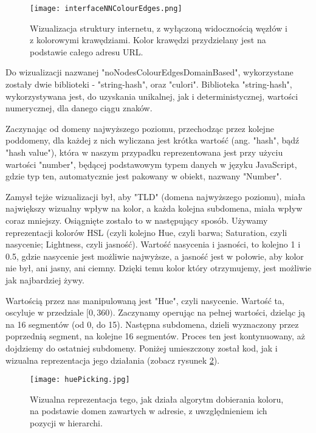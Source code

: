 \documentclass[a4paper, 12pt]{article}
\begin{document}
\begin{figure}[H]
	\centering
	\texttt{[image: interfaceNNColourEdges.png]}
	\caption{Wizualizacja struktury internetu, z wyłączoną widocznością węzłów i z kolorowymi krawędziami. Kolor krawędzi przydzielany jest na podstawie całego adresu URL.}
	\label{fig:nnce}
\end{figure}

Do wizualizacji nazwanej "noNodesColourEdgesDomainBased", wykorzystane zostały dwie biblioteki - "string-hash", oraz "culori". Biblioteka "string-hash", wykorzystywana jest, do uzyskania unikalnej, jak i deterministycznej, wartości numerycznej, dla danego ciągu znaków.

Zaczynając od domeny najwyższego poziomu, przechodząc przez kolejne poddomeny, dla każdej z nich wyliczana jest krótka wartość (ang. "hash", bądź "hash value"), która w naszym przypadku reprezentowana jest przy użyciu wartości "number", będącej podstawowym typem danych w języku JavaScript, gdzie typ ten, automatycznie jest pakowany w obiekt, nazwany "Number".\cite{primitiveMdn}\cite{numberObjectMdn}

Zamysł tejże wizualizacji był, aby "TLD" (domena najwyższego poziomu), miała największy wizualny wpływ na kolor, a każda kolejna subdomena, miała wpływ coraz mniejszy. Osiągnięte zostało to w następujący sposób. Używamy reprezentacji kolorów HSL (czyli kolejno Hue, czyli barwa; Saturation, czyli nasycenie; Lightness, czyli jasność). Wartość nasycenia i jasności, to kolejno 1 i 0.5, gdzie nasycenie jest możliwie najwyższe, a jasność jest w połowie, aby kolor nie był, ani jasny, ani ciemny. Dzięki temu kolor który otrzymujemy, jest możliwie jak najbardziej żywy.

Wartością przez nas manipulowaną jest "Hue", czyli nasycenie. Wartość ta, oscyluje w przedziale \([0, 360)\). Zaczynamy operując na pełnej wartości, dzieląc ją na 16 segmentów (od 0, do 15). Następna subdomena, dzieli wyznaczony przez poprzednią segment, na kolejne 16 segmentów. Proces ten jest kontynuowany, aż dojdziemy do ostatniej subdomeny. Poniżej umieszczony został kod, jak i wizualna reprezentacja jego działania (zobacz rysunek \ref{fig:huepicking}).



\begin{figure}[H]
	\centering
	\texttt{[image: huePicking.jpg]}
	\caption{Wizualna reprezentacja tego, jak działa algorytm dobierania koloru, na podstawie domen zawartych w adresie, z uwzględnieniem ich pozycji w hierarchi.}
	\label{fig:huepicking}
\end{figure}
\end{document}
